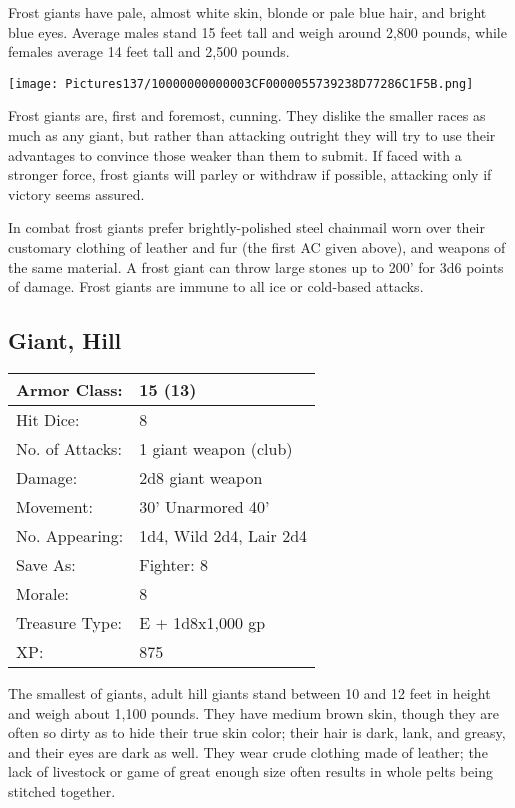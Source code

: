 \documentclass[a4paper,twoside,openany,10pt]{book}
\begin{document}
\begin{multicols}{2}
Frost giants have pale, almost white skin, blonde or pale blue hair, and bright blue eyes. Average males stand 15 feet tall and weigh around 2,800 pounds, while females average 14 feet tall and 2,500 pounds.


\begin{center}
	\texttt{[image: Pictures137/10000000000003CF0000055739238D77286C1F5B.png]}
\end{center}

Frost giants are, first and foremost, cunning. They dislike the smaller races as much as any giant, but rather than attacking outright they will try to use their advantages to convince those weaker than them to submit. If faced with a stronger force, frost giants will parley or withdraw if possible, attacking only if victory seems assured.

In combat frost giants prefer brightly-polished steel chainmail worn over their customary clothing of leather and fur (the first AC given above), and weapons of the same material. A frost giant can throw large stones up to 200' for 3d6 points of damage. Frost giants are immune to all ice or cold-based attacks.


\subsection*{Giant, Hill}\label{giant-hill}

\begin{tabularx}{0.48\textwidth}{@{}lX@{}}
Armor Class: & 15 (13) \\\hline
Hit Dice: & 8 \\\hline
No. of Attacks: & 1 giant weapon (club) \\\hline
Damage: & 2d8 giant weapon \\\hline
Movement: & 30' Unarmored 40' \\\hline
No. Appearing: & 1d4, Wild 2d4, Lair 2d4 \\\hline
Save As: & Fighter: 8 \\\hline
Morale: & 8 \\\hline
Treasure Type: & E + 1d8x1,000 gp \\\hline
XP: & 875 \\\hline
\end{tabularx}\medskip

The
smallest of giants, adult hill giants stand between 10 and 12 feet in height and weigh about 1,100 pounds. They have medium brown skin, though they are often so dirty as to hide their true skin color; their hair is dark, lank, and greasy, and their eyes are dark as well. They wear crude clothing made of leather; the lack of livestock or game of great enough size often results in whole pelts being stitched together.


\end{multicols}
\end{document}
